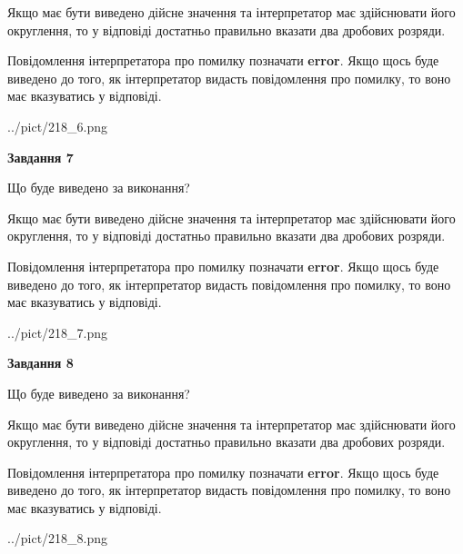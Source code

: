 \documentclass[12pt, ukrainian]{article}
\begin{document}
{\begin {Large}
Якщо має бути виведено дійсне значення та інтерпретатор має здійснювати його округлення, 
то у відповіді достатньо правильно вказати два дробових розряди.

Повідомлення інтерпретатора про помилку позначати \textbf{error}.
Якщо щось буде виведено до того, як інтерпретатор видасть повідомлення про помилку, 
то воно має вказуватись у відповіді. \par

\begin{center}
	{../pict/218_6.png}
\end{center}
\newpage

{\begin {center}\textbf{Завдання 7}\end {center}}\par
Що буде виведено за виконання? \par

Якщо має бути виведено дійсне значення та інтерпретатор має здійснювати його округлення, 
то у відповіді достатньо правильно вказати два дробових розряди.

Повідомлення інтерпретатора про помилку позначати \textbf{error}.
Якщо щось буде виведено до того, як інтерпретатор видасть повідомлення про помилку, 
то воно має вказуватись у відповіді. \par

\begin{center}
	{../pict/218_7.png}
\end{center}
\newpage

{\begin {center}\textbf{Завдання 8}\end {center}}\par
Що буде виведено за виконання? \par

Якщо має бути виведено дійсне значення та інтерпретатор має здійснювати його округлення, 
то у відповіді достатньо правильно вказати два дробових розряди.

Повідомлення інтерпретатора про помилку позначати \textbf{error}.
Якщо щось буде виведено до того, як інтерпретатор видасть повідомлення про помилку, 
то воно має вказуватись у відповіді. \par

\begin{center}
	{../pict/218_8.png}
\end{center}
\newpage


\end{Large}}
\end{document}
